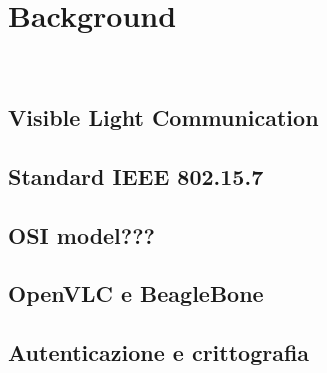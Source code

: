 \chapter{Background}
\label{cap:background}

\\

\section{Visible Light Communication}

\section{Standard IEEE 802.15.7}

\section{OSI model???}

\section{OpenVLC e BeagleBone}

\section{Autenticazione e crittografia}
